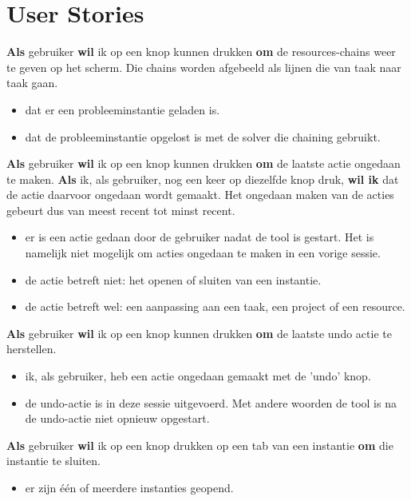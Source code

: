 \section{User Stories}
\setcounter{userstory}{0}
\nextUserStory
\textbf{Als} gebruiker \textbf{wil} ik op een knop kunnen drukken \textbf{om} de resources-chains weer te geven op het scherm. Die chains worden afgebeeld als lijnen die van taak naar taak gaan. 
\begin{itemize} [label=\emph{ - Gegeven}, itemindent=2.5em, labelsep=0.3em]
    \item dat er een probleeminstantie geladen is.
    \item dat de probleeminstantie opgelost is met de solver die chaining gebruikt. 
\end{itemize}

\nextUserStory
\textbf{Als} gebruiker \textbf{wil} ik op een knop kunnen drukken \textbf{om} de laatste actie ongedaan te maken. \textbf{Als} ik, als gebruiker, nog een keer op diezelfde knop druk, \textbf{wil ik} dat de actie daarvoor ongedaan wordt gemaakt. Het ongedaan maken van de acties gebeurt dus van meest recent tot minst recent. 
\begin{itemize} [label=\emph{ - Gegeven}, itemindent=2.5em, labelsep=0.3em]
    \item er is een actie gedaan door de gebruiker nadat de tool is gestart. Het is namelijk niet mogelijk om acties ongedaan te maken in een vorige sessie. 
    \item de actie betreft niet: het openen of sluiten van een instantie.
    \item de actie betreft wel: een aanpassing aan een taak, een project of een resource. 
\end{itemize}

\nextUserStory
\textbf{Als} gebruiker \textbf{wil} ik op een knop kunnen drukken \textbf{om} de laatste undo actie te herstellen.
\begin{itemize} [label=\emph{ - Gegeven}, itemindent=2.5em, labelsep=0.3em]
    \item ik, als gebruiker, heb een actie ongedaan gemaakt met de 'undo' knop. 
    \item de undo-actie is in deze sessie uitgevoerd. Met andere woorden de tool is na de undo-actie niet opnieuw opgestart. 
\end{itemize}

\nextUserStory
\textbf{Als} gebruiker \textbf{wil} ik op een knop drukken op een tab van een instantie \textbf{om} die instantie te sluiten. 
\begin{itemize} [label=\emph{ - Gegeven}, itemindent=2.5em, labelsep=0.3em]
    \item er zijn \'e\'en of meerdere instanties geopend.
\end{itemize}

